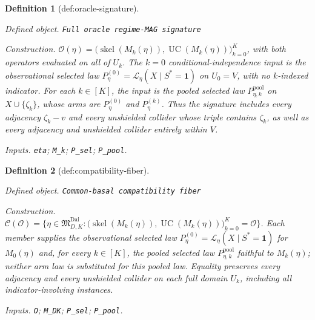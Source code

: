 \documentclass{article}
\newtheorem{definition}{Definition}
\begin{document}
\begin{definition}[def:oracle-signature]\label{def:oracle-signature}
\par\smallskip\noindent\emph{Defined object.} \texttt{Full oracle regime-\allowbreak{}MAG signature}
\par\smallskip\noindent\emph{Construction.} \(\mathcal O(\eta)=\bigl(\operatorname{skel}(M_k(\eta)),\operatorname{UC}(M_k(\eta))\bigr)_{k=0}^{K}\), with both operators evaluated on all of \(U_k\). The \(k=0\) conditional-independence input is the observational selected law \(P_{\eta}^{(0)}=\mathcal L_{\eta}(X\mid S^*=\mathbf 1)\) on \(U_0=V\), with no \(k\)-indexed indicator. For each \(k\in[K]\), the input is the pooled selected law \(P_{\eta,k}^{\mathrm{pool}}\) on \(X\cup\{\zeta_k\}\), whose arms are \(P_{\eta}^{(0)}\) and \(P_{\eta}^{(k)}\). Thus the signature includes every adjacency \(\zeta_k-v\) and every unshielded collider whose triple contains \(\zeta_k\), as well as every adjacency and unshielded collider entirely within \(V\).
\par\smallskip\noindent\emph{Inputs.} \texttt{eta}; \texttt{M\_\allowbreak{}k}; \texttt{P\_\allowbreak{}sel}; \texttt{P\_\allowbreak{}pool}.
\end{definition}

\begin{definition}[def:compatibility-fiber]\label{def:compatibility-fiber}
\par\smallskip\noindent\emph{Defined object.} \texttt{Common-\allowbreak{}basal compatibility fiber}
\par\smallskip\noindent\emph{Construction.} \(\mathcal C(\mathcal O)=\{\eta\in\mathfrak M_{D,K}^{\mathrm{Dai}}:\bigl(\operatorname{skel}(M_k(\eta)),\operatorname{UC}(M_k(\eta))\bigr)_{k=0}^{K}=\mathcal O\}\). Each member supplies the observational selected law \(P_{\eta}^{(0)}=\mathcal L_{\eta}(X\mid S^*=\mathbf 1)\) for \(M_0(\eta)\) and, for every \(k\in[K]\), the pooled selected law \(P_{\eta,k}^{\mathrm{pool}}\) faithful to \(M_k(\eta)\); neither arm law is substituted for this pooled law. Equality preserves every adjacency and every unshielded collider on each full domain \(U_k\), including all indicator-involving instances.
\par\smallskip\noindent\emph{Inputs.} \texttt{O}; \texttt{M\_\allowbreak{}DK}; \texttt{P\_\allowbreak{}sel}; \texttt{P\_\allowbreak{}pool}.
\end{definition}
\end{document}
